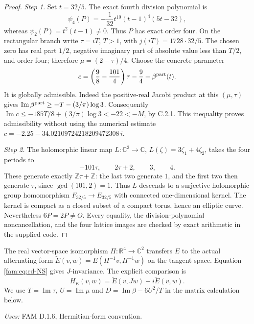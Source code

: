 \begin{proof}
\par\noindent\textit{Step 1.} Set \(t=32/5\). The exact fourth division polynomial is
\[
 \psi_4(P)=-\frac1{32}t^{10}(t-1)^4(5t-32),
\]
whereas \(\psi_2(P)=t^2(t-1)\ne0\). Thus \(P\) has exact order four.
On the rectangular branch write \(\tau=iT\), \(T>1\), with
\(j(iT)=1728\cdot32/5\). The chosen zero has real part \(1/2\), negative
imaginary part of absolute value less than \(T/2\), and order four;
therefore \(\mu=(2-\tau)/4\). Choose the concrete parameter
\[
 c=\left(\frac98-\frac{101}{4}\right)\tau-\frac94
       -\beta^{\rm part}(t).
\]
It is globally admissible. Indeed the positive-real Jacobi product at this
\((\mu,\tau)\) gives
\(\operatorname{Im}\beta^{\rm part}\geq-T-(3/\pi)\log3\).
Consequently
\(\operatorname{Im}c\leq-185T/8+(3/\pi)\log3<-22<-M\), by C.2.1.
This inequality proves admissibility without using the numerical estimate
\(c=-2.25-34.02109724218209472308\,i\).

\par\noindent\textit{Step 2.} The holomorphic linear map \(L:\mathbb C^2\to\mathbb C\),
\(L(\zeta)=3\zeta_1+4\zeta_2\), takes the four periods to
\[
 -101\tau,\qquad2\tau+2,\qquad3,\qquad4.
\]
These generate exactly \(\mathbb Z\tau+\mathbb Z\): the last two generate
\(1\), and the first two then generate \(\tau\), since
\(\gcd(101,2)=1\). Thus \(L\) descends to a surjective holomorphic group
homomorphism \(F_{32/5}\to E_{32/5}\) with connected one-dimensional
kernel. The kernel is compact as a closed subset of a compact torus,
hence an elliptic curve. Nevertheless \(6P=2P\ne O\).
Every equality, the division-polynomial noncancellation, and the four
lattice images are checked by exact arithmetic in the supplied code.
\end{proof}

\begin{definition}\label{fam:D.1.Hermitian}
The real vector-space isomorphism
$\Pi:\mathbb R^4\to\mathbb C^2$ transfers $E$ to the actual alternating
form $\widetilde E(v,w)=E(\Pi^{-1}v,\Pi^{-1}w)$ on the tangent space.
Equation \eqref{fam:eq:cd-NS} gives $J$-invariance. The explicit comparison is
\[
 H_E(v,w)=\widetilde E(v,Jw)-i\widetilde E(v,w).
\] We use $T=\operatorname{Im}\tau$, $U=\operatorname{Im}\mu$ and $D=\operatorname{Im}\beta-6U^2/T$ in the matrix calculation below.
\end{definition}
\noindent\emph{Uses:} FAM D.1.6, Hermitian-form convention.\par

